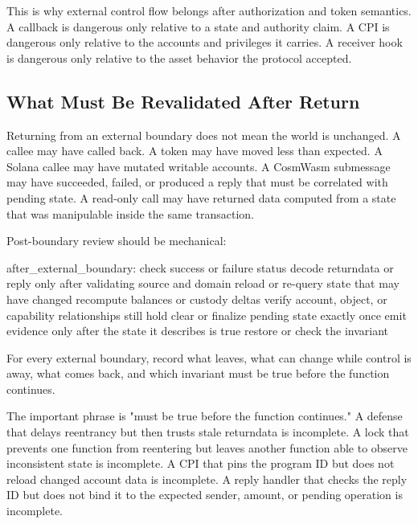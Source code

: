 This is why external control flow belongs after authorization and token semantics. A callback is dangerous only relative to a state and authority claim. A CPI is dangerous only relative to the accounts and privileges it carries. A receiver hook is dangerous only relative to the asset behavior the protocol accepted.

\subsection{What Must Be Revalidated After Return}

Returning from an external boundary does not mean the world is unchanged. A callee may have called back. A token may have moved less than expected. A Solana callee may have mutated writable accounts. A CosmWasm submessage may have succeeded, failed, or produced a reply that must be correlated with pending state. A read-only call may have returned data computed from a state that was manipulable inside the same transaction.

Post-boundary review should be mechanical:

\begin{codeblock}
after_external_boundary:
    check success or failure status
    decode returndata or reply only after validating source and domain
    reload or re-query state that may have changed
    recompute balances or custody deltas
    verify account, object, or capability relationships still hold
    clear or finalize pending state exactly once
    emit evidence only after the state it describes is true
    restore or check the invariant
\end{codeblock}

\begin{artifactbox}
For every external boundary, record what leaves, what can change while control is away, what comes back, and which invariant must be true before the function continues.
\end{artifactbox}

The important phrase is "must be true before the function continues." A defense that delays reentrancy but then trusts stale returndata is incomplete. A lock that prevents one function from reentering but leaves another function able to observe inconsistent state is incomplete. A CPI that pins the program ID but does not reload changed account data is incomplete. A reply handler that checks the reply ID but does not bind it to the expected sender, amount, or pending operation is incomplete.

